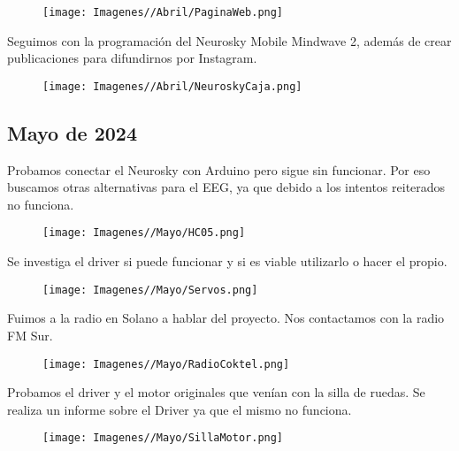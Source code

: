 \documentclass{article}
\begin{document}
\begin{figure}[H]
    \centering
    \texttt{[image: Imagenes//Abril/PaginaWeb.png]}
\end{figure}

Seguimos con la programación del Neurosky Mobile Mindwave 2, además de crear publicaciones para difundirnos por Instagram.

\begin{figure}[H]
    \centering
    \texttt{[image: Imagenes//Abril/NeuroskyCaja.png]}
\end{figure}

\newpage


\begin{center}
    \section{Mayo de 2024}
\end{center}






Probamos conectar el Neurosky con Arduino pero sigue sin funcionar. Por eso buscamos otras alternativas para el EEG, ya que debido a los intentos reiterados no funciona.

\begin{figure}[H]
    \centering
    \texttt{[image: Imagenes//Mayo/HC05.png]}
\end{figure}



Se investiga el driver si puede funcionar y si es viable utilizarlo o hacer el propio.

\begin{figure}[H]
    \centering
    \texttt{[image: Imagenes//Mayo/Servos.png]}
\end{figure}

\newpage

Fuimos a la radio en Solano a hablar del proyecto. Nos contactamos con la radio FM Sur.

\begin{figure}[H]
    \centering
    \texttt{[image: Imagenes//Mayo/RadioCoktel.png]}
\end{figure}


Probamos el driver y el motor originales que venían con la silla de ruedas. Se realiza un informe sobre el Driver ya que el mismo no funciona.

\begin{figure}[H]
    \centering
    \texttt{[image: Imagenes//Mayo/SillaMotor.png]}
\end{figure}
\end{document}
